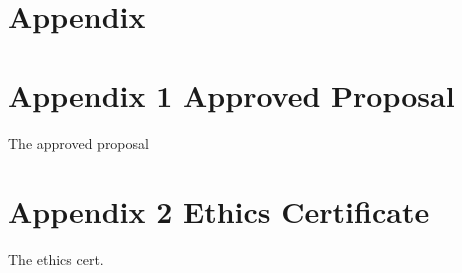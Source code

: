 \documentclass[
]{article}
\begin{document}
\hypertarget{appendix}{%
\section*{Appendix}\label{appendix}}

\hypertarget{appendix-1-approved-proposal}{%
\section{Appendix 1 Approved
Proposal}\label{appendix-1-approved-proposal}}

The approved proposal

\hypertarget{appendix-2-ethics-certificate}{%
\section{Appendix 2 Ethics
Certificate}\label{appendix-2-ethics-certificate}}

The ethics cert.
\end{document}
